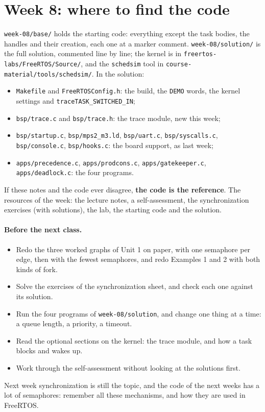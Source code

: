 \section{Week 8: where to find the code}
\texttt{week-08/base/} holds the starting code: everything except the task bodies, the handles and their creation, each one at a marker comment. \texttt{week-08/solution/} is the full solution, commented line by line; the kernel is in \texttt{freertos-labs/FreeRTOS/Source/}, and the \texttt{schedsim} tool in \texttt{course-material/tools/schedsim/}. In the solution:
\begin{itemize}\sloppy
    \item \texttt{Makefile} and \texttt{FreeRTOSConfig.h}: the build, the \texttt{DEMO} words, the kernel settings and \texttt{traceTASK\_SWITCHED\_IN};
    \item \texttt{bsp/trace.c} and \texttt{bsp/trace.h}: the trace module, new this week;
    \item \texttt{bsp/startup.c}, \texttt{bsp/mps2\_m3.ld}, \texttt{bsp/uart.c}, \texttt{bsp/syscalls.c}, \texttt{bsp/console.c}, \texttt{bsp/hooks.c}: the board support, as last week;
    \item \texttt{apps/precedence.c}, \texttt{apps/prodcons.c}, \texttt{apps/gatekeeper.c}, \texttt{apps/deadlock.c}: the four programs.
\end{itemize}
If these notes and the code ever disagree, \textbf{the code is the reference}. The resources of the week: the lecture notes, a self-assessment, the synchronization exercises (with solutions), the lab, the starting code and the solution.

\paragraph{Before the next class.}
\begin{itemize}
    \item Redo the three worked graphs of Unit 1 on paper, with one semaphore per edge, then with the fewest semaphores, and redo Examples 1 and 2 with both kinds of fork.
    \item Solve the exercises of the synchronization sheet, and check each one against its solution.
    \item Run the four programs of \texttt{week-08/solution}, and change one thing at a time: a queue length, a priority, a timeout.
    \item Read the optional sections on the kernel: the trace module, and how a task blocks and wakes up.
    \item Work through the self-assessment without looking at the solutions first.
\end{itemize}
Next week synchronization is still the topic, and the code of the next weeks has a lot of semaphores: remember all these mechanisms, and how they are used in FreeRTOS.

